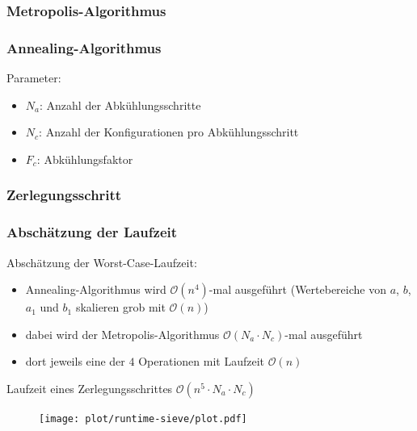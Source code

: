 \begin{frame}
  \frametitle{Metropolis-Algorithmus}
  
\end{frame}

\begin{frame}
  \frametitle{Annealing-Algorithmus}
  Parameter:
  \begin{itemize}
    \item $N_a$: Anzahl der Abkühlungsschritte
    \item $N_c$: Anzahl der Konfigurationen pro Abkühlungsschritt
    \item $F_c$: Abkühlungsfaktor
  \end{itemize}
  \vspace{0.5cm}
  
\end{frame}

\begin{frame}
  \frametitle{Zerlegungsschritt}
  
\end{frame}

\begin{frame}[allowframebreaks]
  \frametitle{Abschätzung der Laufzeit}
  Abschätzung der Worst-Case-Laufzeit:
  \begin{itemize}
    \item Annealing-Algorithmus wird $\mathcal{O}\left(n^4\right)$-mal ausgeführt (Wertebereiche von $a$, $b$, $a_1$ und $b_1$ skalieren grob mit $\mathcal{O}\left(n\right)$)
    \item dabei wird der Metropolis-Algorithmus $\mathcal{O}\left(N_a\cdot N_c\right)$-mal ausgeführt
    \item dort jeweils eine der $4$ Operationen mit Laufzeit $\mathcal{O}\left(n\right)$
  \end{itemize}
  \Rightarrow{} Laufzeit eines Zerlegungsschrittes $\mathcal{O}\left(n^5\cdot N_a\cdot N_c\right)$
  \pause{}
  \begin{figure}[H]
    \centering
    \texttt{[image: plot/runtime-sieve/plot.pdf]}
  \end{figure}
\end{frame}
